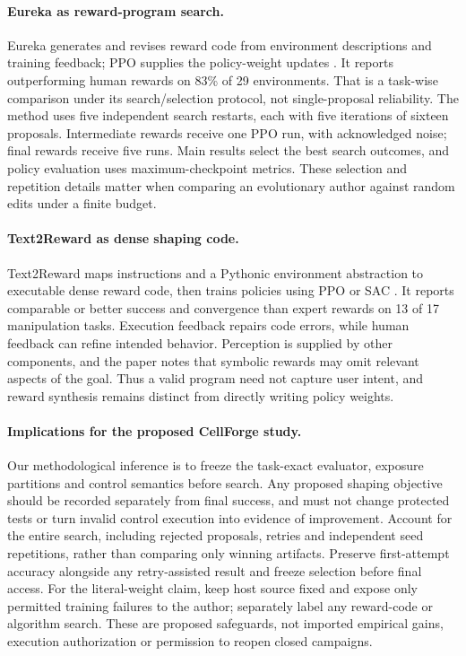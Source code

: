 \documentclass[11pt]{article}
\begin{document}
\paragraph{Eureka as reward-program search.}
Eureka generates and revises reward code from environment descriptions and training
feedback; PPO supplies the policy-weight updates \cite{eureka2023}. It reports
outperforming human rewards on 83\% of 29 environments. That is a task-wise
comparison under its search/selection protocol, not single-proposal reliability.
The method uses five independent search restarts, each with five iterations of
sixteen proposals. Intermediate rewards receive one PPO run, with acknowledged
noise; final rewards receive five runs. Main results select the best search
outcomes, and policy evaluation uses maximum-checkpoint metrics. These selection
and repetition details matter when comparing an evolutionary author against random
edits under a finite budget.

\paragraph{Text2Reward as dense shaping code.}
Text2Reward maps instructions and a Pythonic environment abstraction to executable
dense reward code, then trains policies using PPO or SAC \cite{text2reward2024}.
It reports comparable or better success and convergence than expert rewards on
13 of 17 manipulation tasks. Execution feedback repairs code errors, while human
feedback can refine intended behavior. Perception is supplied by other components,
and the paper notes that symbolic rewards may omit relevant aspects of the goal.
Thus a valid program need not capture user intent, and reward synthesis remains
distinct from directly writing policy weights.

\paragraph{Implications for the proposed CellForge study.}
Our methodological inference is to freeze the task-exact evaluator, exposure
partitions and control semantics before search. Any proposed shaping objective
should be recorded separately from final success, and must not change protected
tests or turn invalid control execution into evidence of improvement.
Account for the entire search, including rejected proposals, retries and independent
seed repetitions, rather than comparing only winning artifacts. Preserve first-attempt
accuracy alongside any retry-assisted result and freeze selection before final access.
For the literal-weight claim, keep host source fixed and expose only permitted
training failures to the author; separately label any reward-code or algorithm
search. These are proposed safeguards, not imported empirical gains, execution
authorization or permission to reopen closed campaigns.
\end{document}
